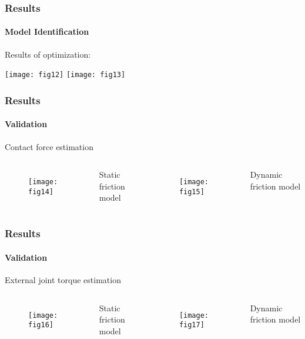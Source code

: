 \documentclass[12pt,english]{beamer}
\begin{document}
  
  \begin{frame}
    \frametitle{Results}
    \framesubtitle{Model Identification}
    Results of optimization:
    \begin{center}
      \texttt{[image: fig12]}
      \texttt{[image: fig13]}
    \end{center}
  \end{frame}
  
  
  \begin{frame}
    \frametitle{Results}
    \framesubtitle{Validation}
    Contact force estimation
    \begin{columns}
      \centering
        \begin{figure}
          \texttt{[image: fig14]}
        \end{figure}
        Static friction model
      \centering
        \begin{figure}
          \texttt{[image: fig15]}
        \end{figure}
        Dynamic friction model
    \end{columns}
  \end{frame}

  \begin{frame}
    \frametitle{Results}
    \framesubtitle{Validation}
    External joint torque estimation
    \begin{columns}
      \centering
        \begin{figure}
          \texttt{[image: fig16]}
        \end{figure}
        Static friction model
      \centering
        \begin{figure}
          \texttt{[image: fig17]}
        \end{figure}
        Dynamic friction model
    \end{columns}
  \end{frame}
  
\end{document}
